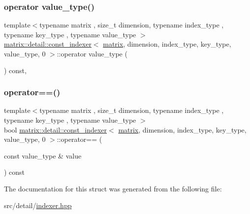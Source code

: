 \subsubsection{\texorpdfstring{operator value\+\_\+type()}{operator value\_type()}}
{\footnotesize\ttfamily template$<$typename matrix , size\+\_\+t dimension, typename index\+\_\+type , typename key\+\_\+type , typename value\+\_\+type $>$ \\
\hyperlink{structmatrix_1_1detail_1_1const__indexer}{matrix\+::detail\+::const\+\_\+indexer}$<$ \hyperlink{structmatrix_1_1matrix}{matrix}, dimension, index\+\_\+type, key\+\_\+type, value\+\_\+type, 0 $>$\+::operator value\+\_\+type (\begin{DoxyParamCaption}{ }\end{DoxyParamCaption}) const\hspace{0.3cm}{\ttfamily [inline]}, {\ttfamily [explicit]}}

\mbox{\label{structmatrix_1_1detail_1_1const__indexer_3_01matrix_00_01dimension_00_01index__type_00_01key__type_00_01value__type_00_010_01_4_a9410cf64bd67b22b726b573b56f9b095}} 
\subsubsection{\texorpdfstring{operator==()}{operator==()}}
{\footnotesize\ttfamily template$<$typename matrix , size\+\_\+t dimension, typename index\+\_\+type , typename key\+\_\+type , typename value\+\_\+type $>$ \\
bool \hyperlink{structmatrix_1_1detail_1_1const__indexer}{matrix\+::detail\+::const\+\_\+indexer}$<$ \hyperlink{structmatrix_1_1matrix}{matrix}, dimension, index\+\_\+type, key\+\_\+type, value\+\_\+type, 0 $>$\+::operator== (\begin{DoxyParamCaption}\item[{const value\+\_\+type \&}]{value }\end{DoxyParamCaption}) const\hspace{0.3cm}{\ttfamily [inline]}}



The documentation for this struct was generated from the following file\+:\begin{DoxyCompactItemize}
\item 
src/detail/\hyperlink{indexer_8hpp}{indexer.\+hpp}\end{DoxyCompactItemize}
